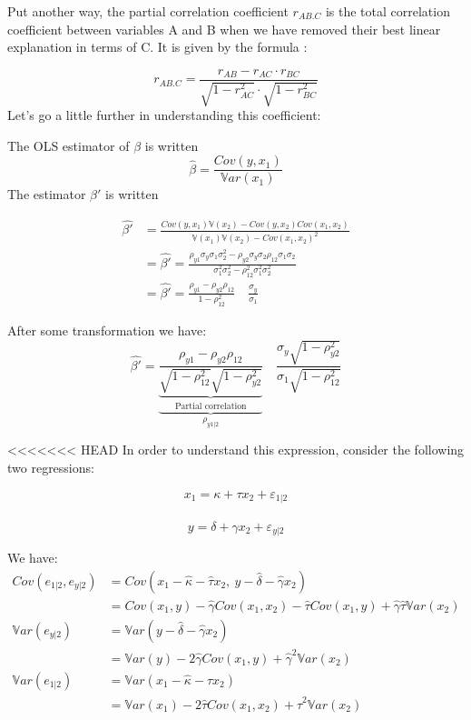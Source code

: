 \documentclass[
]{report}
\begin{document}
Put another way, the partial correlation coefficient \(r_{AB.C}\) is the total correlation coefficient between variables A and B when we have removed their best linear explanation in terms of C. It is given by the formula :

\[r_{AB.C}=\frac{r_{AB}-r_{AC} \cdot r_{BC}}{\sqrt{1-r_{AC}^2} \cdot \sqrt{1-r_{BC}^2}}\]
Let's go a little further in understanding this coefficient:

The OLS estimator of \(\beta\) is written
\[\hat{\beta}=\frac{Cov(y,x_1)}{\mathbb{V}ar(x_1)}\]
The estimator \(\beta'\) is written

\begin{align*}
  \hat{\beta'} &= \frac{Cov(y,x_1)\mathbb{V}(x_2)-Cov(y,x_2)Cov(x_1,x_2)}{
  \mathbb{V}(x_1)\mathbb{V}(x_2)-Cov(x_1,x_2)^2} \\
&= \hat{\beta'}=\frac{\rho_{y1} \sigma_y \sigma_1\sigma_2^2-\rho_{y2} \sigma_y     \sigma_2\rho_{12} \sigma_1 \sigma_2}{\sigma_1^2\sigma_2^2-\rho_{12}^2 \sigma_1^2 \sigma_2^2} \\
&= \hat{\beta'}={\frac{\rho_{y1}-\rho_{y2}\rho_{12}} 
{1-\rho_{12}^2}}\quad\frac{\sigma_y}{\sigma_1}
\end{align*}

After some transformation we have:
\[\hat{\beta'}=\underbrace{\underbrace{\frac{\rho_{y1}-\rho_{y2}\rho_{12}} 
{\sqrt{1-\rho_{12}^2}\sqrt{1-\rho_{y2}^2}}}_{\text{Partial correlation}}}_{\rho_{y1|2}}
\quad\frac{\sigma_y\sqrt{1-\rho_{y2}^2}}{\sigma_1\sqrt{1-\rho_{12}^2}}\]

\textless\textless\textless\textless\textless\textless\textless{} HEAD
In order to understand this expression, consider the following two regressions:

\[x_1=\kappa +\tau x_2+\varepsilon_{1|2}\]\\
\[y=\delta +\gamma x_2+\varepsilon_{y|2}\]

We have:
\begin{align*}
Cov(e_{1|2},e_{y|2})&=Cov(x_1-\hat{\kappa}-\hat{\tau} x_2,~y-\hat{\delta} -\hat{\gamma} x_2)\\
&=Cov(x_1,y)-\hat{\gamma}Cov(x_1,x_2)-\hat{\tau}Cov(x_1,y)+\hat{\gamma}\hat{\tau}\mathbb{V}ar(x_2)\\
\mathbb{V}ar(e_{y|2})&=\mathbb{V}ar(y-\hat{\delta} - \hat{\gamma} x_2)\\
&=\mathbb{V}ar(y)-2\hat{\gamma}Cov(x_1,y)+\hat{\gamma}^2\mathbb{V}ar(x_2)\\
\mathbb{V}ar(e_{1|2})&=\mathbb{V}ar(x_1-\hat{\kappa} - \hat{\tau} x_2)\\
&=\mathbb{V}ar(x_1)-2\hat{\tau}Cov(x_1,x_2)+\hat{\tau}^2\mathbb{V}ar(x_2)
\end{align*}
\end{document}
